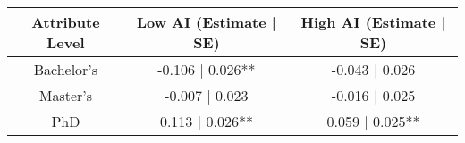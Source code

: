 \begin{table}[t]
\fontsize{12.0pt}{14.4pt}\selectfont
\begin{tabular*}{\linewidth}{@{\extracolsep{\fill}}ccc}
\toprule
Attribute Level & Low AI (Estimate | SE) & High AI (Estimate | SE) \\ 
\midrule\addlinespace[2.5pt]
Bachelor's & -0.106 | 0.026** & -0.043 | 0.026 \\ 
Master's & -0.007 | 0.023 & -0.016 | 0.025 \\ 
PhD & 0.113 | 0.026** & 0.059 | 0.025** \\ 
\bottomrule
\end{tabular*}
\end{table}

